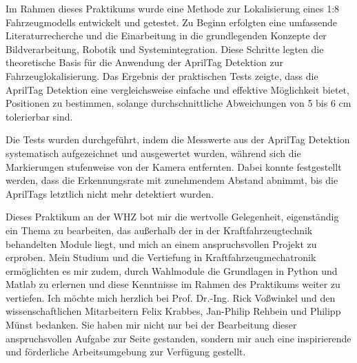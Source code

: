 \documentclass[ngerman]{article}    %
\theoremstyle{definition}
\begin{document}
Im Rahmen dieses Praktikums wurde eine Methode zur Lokalisierung eines 1:8 Fahrzeugmodells entwickelt und getestet. Zu Beginn erfolgten eine umfassende Literaturrecherche und die Einarbeitung in die grundlegenden Konzepte der Bildverarbeitung, Robotik und Systemintegration. Diese Schritte legten die theoretische Basis für die Anwendung der AprilTag Detektion zur Fahrzeuglokalisierung. Das Ergebnis der praktischen Tests zeigte, dass die AprilTag Detektion eine vergleichsweise einfache und effektive Möglichkeit bietet, Positionen zu bestimmen, solange durchschnittliche Abweichungen von 5 bis 6 cm tolerierbar sind.

Die Tests wurden durchgeführt, indem die Messwerte aus der AprilTag Detektion systematisch aufgezeichnet und ausgewertet wurden, während sich die Markierungen stufenweise von der Kamera entfernten. Dabei konnte festgestellt werden, dass die Erkennungsrate mit zunehmendem Abstand abnimmt, bis die AprilTags letztlich nicht mehr detektiert wurden.

Dieses Praktikum an der WHZ bot mir die wertvolle Gelegenheit, eigenständig ein Thema zu bearbeiten, das außerhalb der in der Kraftfahrzeugtechnik behandelten Module liegt, und mich an einem anspruchsvollen Projekt zu erproben. Mein Studium und die Vertiefung in Kraftfahrzeugmechatronik ermöglichten es mir zudem, durch Wahlmodule die Grundlagen in Python und Matlab zu erlernen und diese Kenntnisse im Rahmen des Praktikums weiter zu vertiefen. Ich möchte mich herzlich bei Prof. Dr.-Ing. Rick Voßwinkel und den wissenschaftlichen Mitarbeitern Felix Krabbes, Jan-Philip Rehbein und Philipp Münst bedanken. Sie haben mir nicht nur bei der Bearbeitung dieser anspruchsvollen Aufgabe zur Seite gestanden, sondern mir auch eine inspirierende und förderliche Arbeitsumgebung zur Verfügung gestellt.

\newpage
\nocite{*}
\printbibliography
\end{document}
